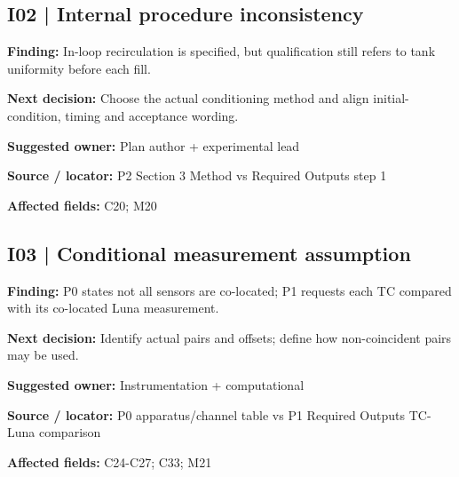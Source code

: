 \documentclass[11pt]{article}
\begin{document}
\par\noindent\begin{minipage}{\textwidth}\small\setlength{\parskip}{2pt}
\subsection*{I02 | Internal procedure inconsistency}
\textbf{Finding:} In-loop recirculation is specified, but qualification still refers to tank uniformity before each fill.\par
\textbf{Next decision:} Choose the actual conditioning method and align initial-condition, timing and acceptance wording.\par
\textbf{Suggested owner:} Plan author + experimental lead\par
\textbf{Source / locator:} P2 Section 3 Method vs Required Outputs step 1\par
\textbf{Affected fields:} C20; M20\par
\end{minipage}\par\vspace{8pt}
\par\noindent\begin{minipage}{\textwidth}\small\setlength{\parskip}{2pt}
\subsection*{I03 | Conditional measurement assumption}
\textbf{Finding:} P0 states not all sensors are co-located; P1 requests each TC compared with its co-located Luna measurement.\par
\textbf{Next decision:} Identify actual pairs and offsets; define how non-coincident pairs may be used.\par
\textbf{Suggested owner:} Instrumentation + computational\par
\textbf{Source / locator:} P0 apparatus/channel table vs P1 Required Outputs TC-Luna comparison\par
\textbf{Affected fields:} C24-C27; C33; M21\par
\end{minipage}\par\vspace{8pt}
\end{document}

